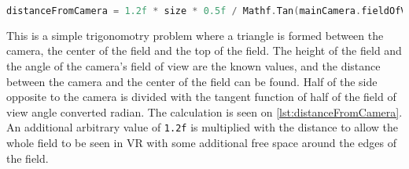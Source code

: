 \begin{lstlisting}[caption={Calculation of the distance between the camera and field}, captionpos=b,language=C,label={lst:distanceFromCamera}]
    distanceFromCamera = 1.2f * size * 0.5f / Mathf.Tan(mainCamera.fieldOfView * 0.5f * Mathf.Deg2Rad);
\end{lstlisting}
This is a simple trigonomotry problem where a triangle is formed between the camera, the center of the field and the top of the field.
The height of the field and the angle of the camera's field of view are the known values, and the distance between the camera and the center of the field can be found. 
Half of the side opposite to the camera is divided with the tangent function of half of the field of view angle converted radian.
The calculation is seen on \autoref{lst:distanceFromCamera}.
An additional arbitrary value of \texttt{1.2f} is multiplied with the distance to allow the whole field to be seen in VR with some additional free space around the edges of the field.